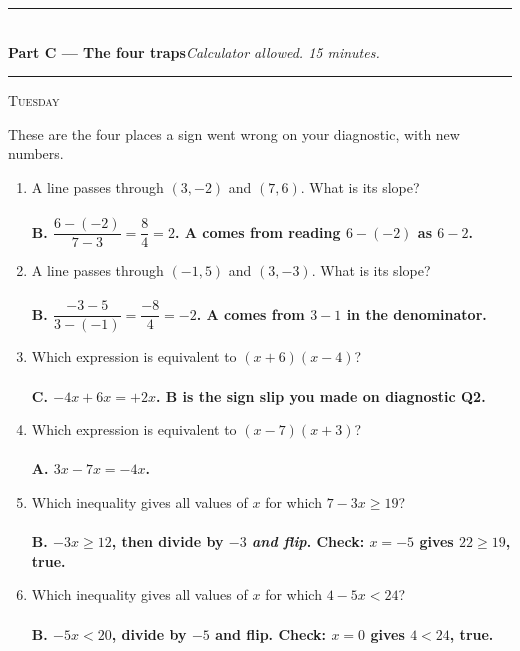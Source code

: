 \documentclass[11pt,a4paper]{article}
\newcommand{\PartHead}[2]{%
  \vspace{6pt}
  {\color{navy}\rule{\textwidth}{0.8pt}}\\[2pt]
  {\large\bfseries\color{navy}#1}\hfill{\small\itshape #2}\\[-4pt]
  {\color{navy}\rule{\textwidth}{0.4pt}}
  \vspace{4pt}
}
\newcommand{\sitting}[1]{{\footnotesize\textsc{\color{navy}#1}}\par\vspace{2pt}}
\newcommand{\ans}[1]{\ {\color{keyred}\bfseries #1}}
\newcommand{\ans}[1]{}
\begin{document}
\PartHead{Part C --- The four traps}{Calculator allowed. 15 minutes.}
\sitting{Tuesday}
These are the four places a sign went wrong on your diagnostic, with new numbers.

\begin{enumerate}[leftmargin=20pt,itemsep=8pt]
\item A line passes through $(3,-2)$ and $(7,6)$. What is its slope?\\
  \ans{\\ B. $\dfrac{6-(-2)}{7-3}=\dfrac{8}{4}=2$. A comes from reading $6-(-2)$ as $6-2$.}

\item A line passes through $(-1,5)$ and $(3,-3)$. What is its slope?\\
  \ans{\\ B. $\dfrac{-3-5}{3-(-1)}=\dfrac{-8}{4}=-2$. A comes from $3-1$ in the denominator.}

\item Which expression is equivalent to $(x+6)(x-4)$?\\
  \ans{\\ C. $-4x+6x=+2x$. B is the sign slip you made on diagnostic Q2.}

\item Which expression is equivalent to $(x-7)(x+3)$?\\
  \ans{\\ A. $3x-7x=-4x$.}

\item Which inequality gives all values of $x$ for which $7-3x\ge 19$?\\
  \ans{\\ B. $-3x\ge12$, then divide by $-3$ \emph{and flip}. Check: $x=-5$ gives $22\ge19$, true.}

\item Which inequality gives all values of $x$ for which $4-5x<24$?\\
  \ans{\\ B. $-5x<20$, divide by $-5$ and flip. Check: $x=0$ gives $4<24$, true.}


\end{enumerate}
\end{document}
